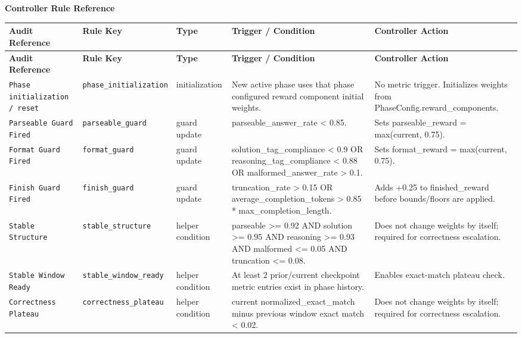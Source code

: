 \documentclass[10pt]{article}
\begin{document}
\begin{center}
{\LARGE \textbf{Controller Rule Reference}}\\[0.75em]
\end{center}
\renewcommand{\arraystretch}{1.14}
\setlength{\tabcolsep}{3pt}
\scriptsize
\begin{longtable}{L{0.14\textwidth} L{0.14\textwidth} L{0.11\textwidth} L{0.32\textwidth} L{0.22\textwidth}}
\toprule
\textbf{Audit Reference} & \textbf{Rule Key} & \textbf{Type} & \textbf{Trigger / Condition} & \textbf{Controller Action} \\
\midrule
\endfirsthead
\toprule
\textbf{Audit Reference} & \textbf{Rule Key} & \textbf{Type} & \textbf{Trigger / Condition} & \textbf{Controller Action} \\
\midrule
\endhead
\texttt{Phase initialization / reset} &
\texttt{phase\_initialization} &
initialization &
New active phase uses that phase configured reward component initial weights. &
No metric trigger. Initializes weights from PhaseConfig.reward\_components. \\
\midrule
\texttt{Parseable Guard Fired} &
\texttt{parseable\_guard} &
guard update &
parseable\_answer\_rate < 0.85. &
Sets parseable\_reward = max(current, 0.75). \\
\midrule
\texttt{Format Guard Fired} &
\texttt{format\_guard} &
guard update &
solution\_tag\_compliance < 0.9 OR reasoning\_tag\_compliance < 0.88 OR malformed\_answer\_rate > 0.1. &
Sets format\_reward = max(current, 0.75). \\
\midrule
\texttt{Finish Guard Fired} &
\texttt{finish\_guard} &
guard update &
truncation\_rate > 0.15 OR average\_completion\_tokens > 0.85 * max\_completion\_length. &
Adds +0.25 to finished\_reward before bounds/floors are applied. \\
\midrule
\texttt{Stable Structure} &
\texttt{stable\_structure} &
helper condition &
parseable >= 0.92 AND solution >= 0.95 AND reasoning >= 0.93 AND malformed <= 0.05 AND truncation <= 0.08. &
Does not change weights by itself; required for correctness escalation. \\
\midrule
\texttt{Stable Window Ready} &
\texttt{stable\_window\_ready} &
helper condition &
At least 2 prior/current checkpoint metric entries exist in phase history. &
Enables exact-match plateau check. \\
\midrule
\texttt{Correctness Plateau} &
\texttt{correctness\_plateau} &
helper condition &
current normalized\_exact\_match minus previous window exact match < 0.02. &
Does not change weights by itself; required for correctness escalation. \\

\end{longtable}
\end{document}
